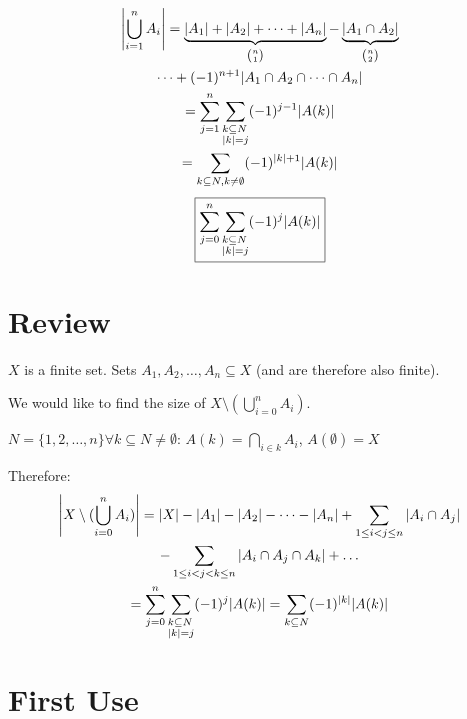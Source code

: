 \documentclass[00_complete]{subfiles}
\begin{document}
\begin{theorem}
    $$\begin{gathered}
        \left|\bigcup_{i=1}^nA_i\right| = \underbrace{|A_1|+|A_2|+\dots+|A_n|}_{\binom{n}{1}}
    - \underbrace{|A_1\cap A_2|}_{\binom{n}{2}} \\\dots +(-1)^{n+1}|A_1\cap A_2
    \cap \dots \cap A_n|\\
    =\sum_{j=1}^{n}\sum_{\begin{subarray}{l} k \subseteq N \\ |k| =
    j\end{subarray}} (-1)^{j-1}|A(k)| \\
    = \sum_{k \subseteq N, k \neq \emptyset} (-1)^{|k|+1}|A(k)|
    \end{gathered}
    $$
    $$\boxed{\sum_{j=0}^n\sum_{\begin{subarray}{l}k \subseteq N \\ |k|= j\end{subarray}}
    (-1)^j|A(k)|}$$
\end{theorem}

\section{Review}

$X$ is a finite set. Sets $A_1, A_2, \dots, A_n \subseteq X$ (and are therefore
also finite).

We would like to find the size of $X \setminus (\bigcup_{i=0}^nA_i)$.

$N=\{1,2,\dots, n\} \forall k \subseteq N \neq \emptyset$:
$A(k)=\bigcap_{i\in k} A_i$, $A(\emptyset)=X$

Therefore:
$$
\begin{gathered}
\left|X \setminus (\bigcup_{i=0}^nA_i)\right|=|X|
-|A_1|-|A_2|-\dots-|A_n|
+\sum_{1\leq i < j \leq n}|A_i\cap A_j|\\
-\sum_{1 \leq i<j<k \leq n}|A_i\cap A_j \cap A_k|+\dots\\
=\sum_{j=0}^n\sum_{\begin{subarray}{1}k\subseteq
N\\|k|=j\end{subarray}}(-1)^j|A(k)|=
\sum_{k \subseteq N} (-1)^{|k|}|A(k)|
\end{gathered}
$$

\section{First Use}
\end{document}
